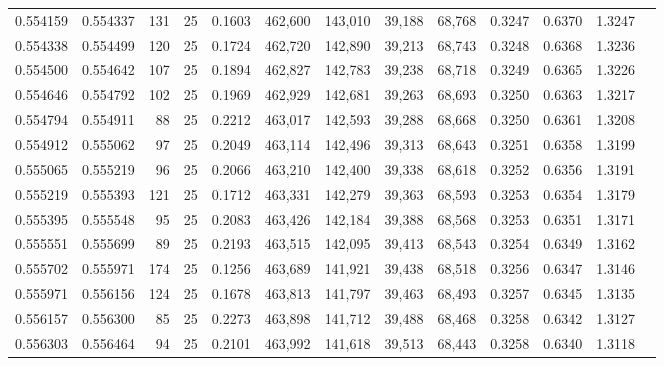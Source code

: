 \begin{tabular}{rrrrrrrrrrrrr}
0.554159 & 0.554337 &   131 &  25 &                                     0.1603 & 462,600 & 143,010 &  39,188 &  68,768 & 0.3247 & 0.6370 & 1.3247 \\
0.554338 & 0.554499 &   120 &  25 &                                     0.1724 & 462,720 & 142,890 &  39,213 &  68,743 & 0.3248 & 0.6368 & 1.3236 \\
0.554500 & 0.554642 &   107 &  25 &                                     0.1894 & 462,827 & 142,783 &  39,238 &  68,718 & 0.3249 & 0.6365 & 1.3226 \\
0.554646 & 0.554792 &   102 &  25 &                                     0.1969 & 462,929 & 142,681 &  39,263 &  68,693 & 0.3250 & 0.6363 & 1.3217 \\
0.554794 & 0.554911 &    88 &  25 &                                     0.2212 & 463,017 & 142,593 &  39,288 &  68,668 & 0.3250 & 0.6361 & 1.3208 \\
0.554912 & 0.555062 &    97 &  25 &                                     0.2049 & 463,114 & 142,496 &  39,313 &  68,643 & 0.3251 & 0.6358 & 1.3199 \\
0.555065 & 0.555219 &    96 &  25 &                                     0.2066 & 463,210 & 142,400 &  39,338 &  68,618 & 0.3252 & 0.6356 & 1.3191 \\
0.555219 & 0.555393 &   121 &  25 &                                     0.1712 & 463,331 & 142,279 &  39,363 &  68,593 & 0.3253 & 0.6354 & 1.3179 \\
0.555395 & 0.555548 &    95 &  25 &                                     0.2083 & 463,426 & 142,184 &  39,388 &  68,568 & 0.3253 & 0.6351 & 1.3171 \\
0.555551 & 0.555699 &    89 &  25 &                                     0.2193 & 463,515 & 142,095 &  39,413 &  68,543 & 0.3254 & 0.6349 & 1.3162 \\
0.555702 & 0.555971 &   174 &  25 &                                     0.1256 & 463,689 & 141,921 &  39,438 &  68,518 & 0.3256 & 0.6347 & 1.3146 \\
0.555971 & 0.556156 &   124 &  25 &                                     0.1678 & 463,813 & 141,797 &  39,463 &  68,493 & 0.3257 & 0.6345 & 1.3135 \\
0.556157 & 0.556300 &    85 &  25 &                                     0.2273 & 463,898 & 141,712 &  39,488 &  68,468 & 0.3258 & 0.6342 & 1.3127 \\
0.556303 & 0.556464 &    94 &  25 &                                     0.2101 & 463,992 & 141,618 &  39,513 &  68,443 & 0.3258 & 0.6340 & 1.3118 \\

\end{tabular}
